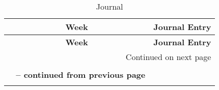 \begin{center}
\begin{longtable}{|c|p{12cm}|}

\hline \multicolumn{1}{|c|}{\textbf{Week}} & \multicolumn{1}{c|}{\textbf{Journal Entry}} \\ \hline 
\endfirsthead

\hline \multicolumn{1}{|c|}{\textbf{Week}} &
\multicolumn{1}{c|}{\textbf{Journal Entry}} \\
\endhead

\hline \multicolumn{2}{|r|}{{Continued on next page}} \\ \hline
\caption[Journal]{Journal} \label{table:journal} \\
\endfoot

\multicolumn{2}{c}%
{{\bfseries \tablename\ \thetable{} -- continued from previous page}} \\
\endlastfoot


\end{longtable}
\end{center}
